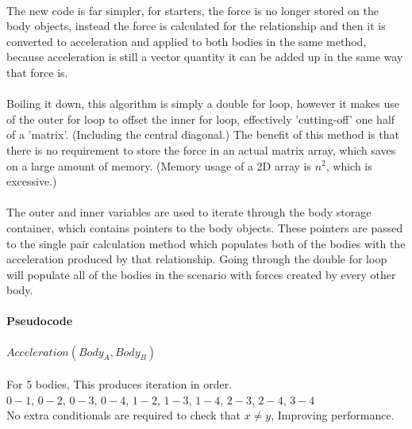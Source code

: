 \paragraph{}
The new code is far simpler, for starters, the force is no longer stored on the body objects, instead the force is calculated for the relationship and then it is converted to acceleration and applied to both bodies in the same method, because acceleration is still a vector quantity it can be added up in the same way that force is.

\paragraph{}
Boiling it down, this algorithm is simply a double for loop, however it makes use of the outer for loop to offset the inner for loop, effectively 'cutting-off' one half of a 'matrix'. (Including the central diagonal.) The benefit of this method is that there is no requirement to store the force in an actual matrix array, which saves on a large amount of memory. (Memory usage of a 2D array is $n^2$, which is excessive.)

\paragraph{}
The outer and inner variables are used to iterate through the body storage container, which contains pointers to the body objects. These pointers are passed to the single pair calculation method which populates both of the bodies with the acceleration produced by that relationship. Going through the double for loop will populate all of the bodies in the scenario with forces created by every other body.

\paragraph{Pseudocode}
\begin{algorithmic}[1]
    \STATE $Acceleration(Body_A,Body_B)$
  \ENDFOR
\ENDFOR
\end{algorithmic}

\paragraph{}
For 5 bodies, This produces iteration in order. \\
$0-1$, $0-2$, $0-3$, $0-4$, $1-2$, $1-3$, $1-4$, $2-3$, $2-4$, $3-4$ \\
No extra conditionals are required to check that $x \neq y$, Improving performance.

